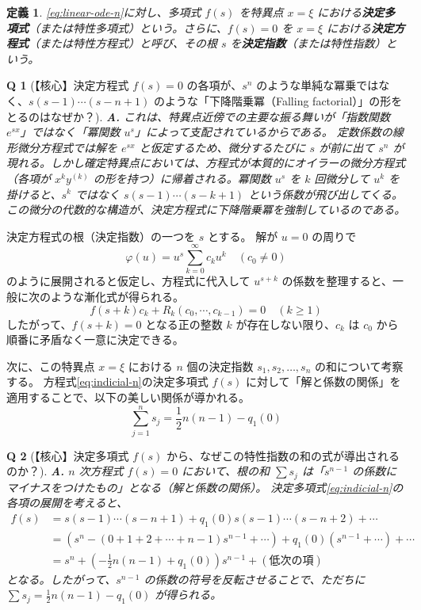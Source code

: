 \documentclass[paper=a4, fontsize=11pt]{jlreq} %
\theoremstyle{break}
\newtheorem{definition}[theorem]{定義}
\theoremstyle{qa}
\newtheorem*{Q}{Q}
\theoremstyle{remark} %
\begin{document}
\begin{definition}
\eqref{eq:linear-ode-n}に対し、多項式 $f(s)$ を特異点 $x=\xi$ における\textbf{決定多項式}（または特性多項式）という。さらに、$f(s)=0$ を $x=\xi$ における\textbf{決定方程式}（または特性方程式）と呼び、その根 $s$ を\textbf{決定指数}（または特性指数）という。
\end{definition}

\begin{Q}[【核心】決定方程式 $f(s)=0$ の各項が、$s^{n}$ のような単純な冪乗ではなく、$s(s-1)\cdots(s-n+1)$ のような「下降階乗冪（Falling factorial）」の形をとるのはなぜか？]
\textbf{A.} これは、特異点近傍での主要な振る舞いが「指数関数 $e^{sx}$」ではなく「冪関数 $u^{s}$」によって支配されているからである。
定数係数の線形微分方程式では解を $e^{sx}$ と仮定するため、微分するたびに $s$ が前に出て $s^{n}$ が現れる。しかし確定特異点においては、方程式が本質的にオイラーの微分方程式（各項が $x^{k} y^{(k)}$ の形を持つ）に帰着される。冪関数 $u^{s}$ を $k$ 回微分して $u^{k}$ を掛けると、$s^{k}$ ではなく $s(s-1)\cdots(s-k+1)$ という係数が飛び出してくる。この微分の代数的な構造が、決定方程式に下降階乗冪を強制しているのである。
\end{Q}

決定方程式の根（決定指数）の一つを $s$ とする。
解が $u=0$ の周りで
\[
\varphi(u) = u^{s}\sum_{k=0}^{\infty} c_{k}u^{k} \quad (c_{0}\neq 0)
\]
のように展開されると仮定し、方程式に代入して $u^{s+k}$ の係数を整理すると、一般に次のような漸化式が得られる。
\begin{equation}\label{eq:recurrence-n}
f(s+k)c_{k} + R_{k}(c_{0}, \cdots, c_{k-1}) = 0 \quad (k \ge 1)
\end{equation}
したがって、$f(s+k) = 0$ となる正の整数 $k$ が存在しない限り、$c_{k}$ は $c_{0}$ から順番に矛盾なく一意に決定できる。

次に、この特異点 $x=\xi$ における $n$ 個の決定指数 $s_{1}, s_{2}, \dots, s_{n}$ の和について考察する。
方程式\eqref{eq:indicial-n}の決定多項式 $f(s)$ に対して「解と係数の関係」を適用することで、以下の美しい関係が導かれる。
\begin{equation}\label{eq:sum-of-exponents}
\sum_{j=1}^{n} s_{j} = \frac{1}{2}n(n-1) - q_{1}(0)
\end{equation}

\begin{Q}[【核心】決定多項式 $f(s)$ から、なぜこの特性指数の和の式が導出されるのか？]
\textbf{A.} $n$ 次方程式 $f(s)=0$ において、根の和 $\sum s_{j}$ は「$s^{n-1}$ の係数にマイナスをつけたもの」となる（解と係数の関係）。
決定多項式\eqref{eq:indicial-n}の各項の展開を考えると、
\begin{align*}
f(s) &= s(s-1)\cdots(s-n+1) + q_{1}(0)s(s-1)\cdots(s-n+2) + \cdots \\
&= \left( s^{n} - (0+1+2+\cdots+n-1)s^{n-1} + \cdots \right) + q_{1}(0)\left( s^{n-1} + \cdots \right) + \cdots \\
&= s^{n} + \left( -\frac{1}{2}n(n-1) + q_{1}(0) \right)s^{n-1} + (\text{低次の項})
\end{align*}
となる。したがって、$s^{n-1}$ の係数の符号を反転させることで、ただちに $\sum s_{j} = \frac{1}{2}n(n-1) - q_{1}(0)$ が得られる。
\end{Q}
\end{document}
